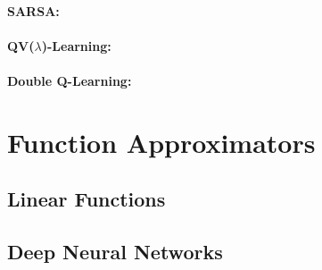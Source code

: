 \paragraph{SARSA:}

\paragraph{QV($\lambda$)-Learning:}

\paragraph{Double Q-Learning:}

\section{Function Approximators}
\subsection{Linear Functions}

\subsection{Deep Neural Networks}

\section{}
